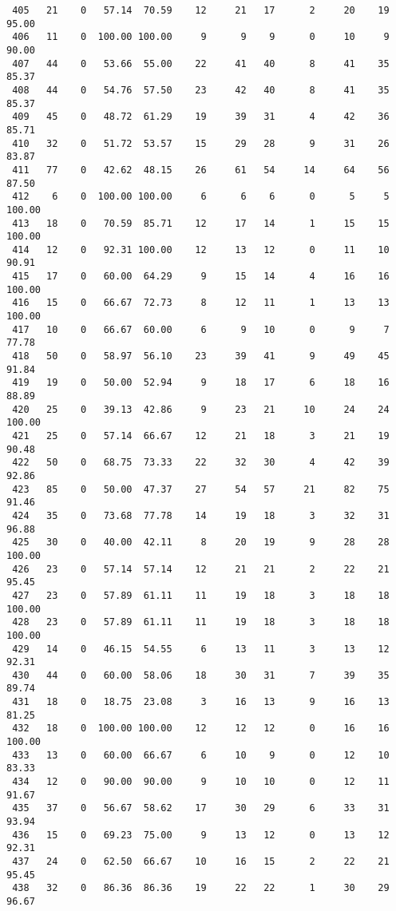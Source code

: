 \begin{verbatim}
 405   21    0   57.14  70.59    12     21   17      2     20    19    95.00
 406   11    0  100.00 100.00     9      9    9      0     10     9    90.00
 407   44    0   53.66  55.00    22     41   40      8     41    35    85.37
 408   44    0   54.76  57.50    23     42   40      8     41    35    85.37
 409   45    0   48.72  61.29    19     39   31      4     42    36    85.71
 410   32    0   51.72  53.57    15     29   28      9     31    26    83.87
 411   77    0   42.62  48.15    26     61   54     14     64    56    87.50
 412    6    0  100.00 100.00     6      6    6      0      5     5   100.00
 413   18    0   70.59  85.71    12     17   14      1     15    15   100.00
 414   12    0   92.31 100.00    12     13   12      0     11    10    90.91
 415   17    0   60.00  64.29     9     15   14      4     16    16   100.00
 416   15    0   66.67  72.73     8     12   11      1     13    13   100.00
 417   10    0   66.67  60.00     6      9   10      0      9     7    77.78
 418   50    0   58.97  56.10    23     39   41      9     49    45    91.84
 419   19    0   50.00  52.94     9     18   17      6     18    16    88.89
 420   25    0   39.13  42.86     9     23   21     10     24    24   100.00
 421   25    0   57.14  66.67    12     21   18      3     21    19    90.48
 422   50    0   68.75  73.33    22     32   30      4     42    39    92.86
 423   85    0   50.00  47.37    27     54   57     21     82    75    91.46
 424   35    0   73.68  77.78    14     19   18      3     32    31    96.88
 425   30    0   40.00  42.11     8     20   19      9     28    28   100.00
 426   23    0   57.14  57.14    12     21   21      2     22    21    95.45
 427   23    0   57.89  61.11    11     19   18      3     18    18   100.00
 428   23    0   57.89  61.11    11     19   18      3     18    18   100.00
 429   14    0   46.15  54.55     6     13   11      3     13    12    92.31
 430   44    0   60.00  58.06    18     30   31      7     39    35    89.74
 431   18    0   18.75  23.08     3     16   13      9     16    13    81.25
 432   18    0  100.00 100.00    12     12   12      0     16    16   100.00
 433   13    0   60.00  66.67     6     10    9      0     12    10    83.33
 434   12    0   90.00  90.00     9     10   10      0     12    11    91.67
 435   37    0   56.67  58.62    17     30   29      6     33    31    93.94
 436   15    0   69.23  75.00     9     13   12      0     13    12    92.31
 437   24    0   62.50  66.67    10     16   15      2     22    21    95.45
 438   32    0   86.36  86.36    19     22   22      1     30    29    96.67

\end{verbatim}
